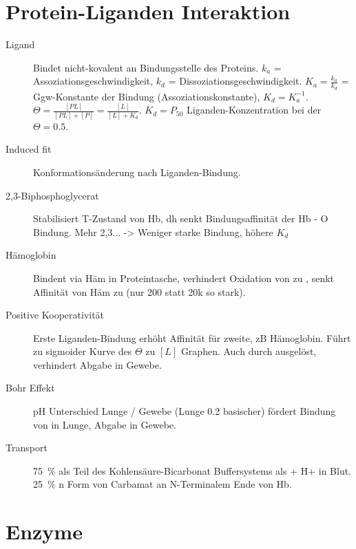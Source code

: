 \documentclass[a4paper,twocolumn,usegeometry,english,fontsize=6,DIV=16]{scrartcl}
\begin{document}
\section{Protein-Liganden Interaktion}

\begin{description}
	\item[Ligand] Bindet nicht-kovalent an Bindungsstelle des Proteins.
		$k_a$ = Assoziationsgeschwindigkeit, $k_d$ =
		Dissoziationsgeschwindigkeit.  $K_a = \frac{k_a}{k_d}$ =
		Ggw-Konstante der Bindung (Assoziationskonstante), $K_d =
		K_a^{-1}$. $\Theta = \frac{[PL]}{[PL] + [P]} = \frac{[L]}{[L] +
		K_d}$. $K_d = P_{50}$ Liganden-Konzentration bei der $\Theta =
		0.5$.
	\item[Induced fit] Konformationsänderung nach Liganden-Bindung.
	\item[2,3-Biphosphoglycerat] Stabilisiert T-Zustand von Hb, dh senkt
		Bindungsaffinität der Hb - O Bindung. Mehr 2,3... -> Weniger
		starke Bindung, höhere $K_d$
	\item[Hämoglobin] Bindent  via Häm in Proteintasche, verhindert
		Oxidation von  zu , senkt Affinität von Häm
		zu  (nur 200 statt 20k so stark).
	\item[Positive Kooperativität] Erste Liganden-Bindung erhöht Affinität
		für zweite, zB Hämoglobin. Führt zu sigmoider Kurve des
		$\Theta$ zu $[L]$ Graphen. Auch durch  ausgelöst,
		verhindert Abgabe in Gewebe.
	\item[Bohr Effekt] pH Unterschied Lunge / Gewebe (Lunge 0.2 basischer)
		fördert Bindung von  in Lunge, Abgabe in Gewebe.
	\item[ Transport] \SI{75}{\percent} als Teil des
		Kohlensäure-Bicarbonat Buffersystems als  + H+ in
		Blut. \SI{25}{\percent}  n Form von Carbamat an N-Terminalem
		Ende von Hb.
\end{description}

\section{Enzyme}
\end{document}
